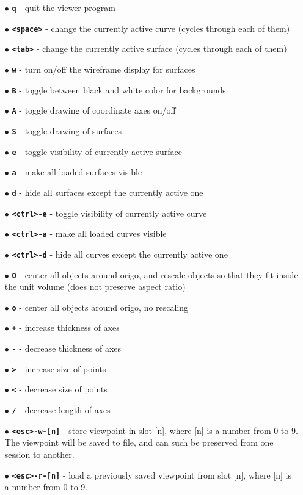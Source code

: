 \begin{itemize}
\item[$\bullet$] \textbf{\verb/q/} - quit the viewer program
\item[$\bullet$] \textbf{\verb/<space>/} - change the currently active curve 
(cycles through each of them)
\item[$\bullet$] \textbf{\verb/<tab>/} - change the currently active surface 
(cycles through each of them)
\item[$\bullet$] \textbf{\verb/w/} - turn on/off the wireframe display for surfaces
\item[$\bullet$] \textbf{\verb/B/} - toggle between black and white color for backgrounds
\item[$\bullet$] \textbf{\verb/A/} - toggle drawing of coordinate axes on/off
\item[$\bullet$] \textbf{\verb/S/} - toggle drawing of surfaces
\item[$\bullet$] \textbf{\verb/e/} - toggle visibility of currently active surface
\item[$\bullet$] \textbf{\verb/a/} - make all loaded surfaces visible
\item[$\bullet$] \textbf{\verb/d/} - hide all surfaces except the currently active one
\item[$\bullet$] \textbf{\verb/<ctrl>-e/} - toggle visibility of currently active curve
\item[$\bullet$] \textbf{\verb/<ctrl>-a/} - make all loaded curves visible
\item[$\bullet$] \textbf{\verb/<ctrl>-d/} - hide all curves except the currently active one
\item[$\bullet$] \textbf{\verb/O/} - center all objects around origo, and rescale objects
so that they fit inside the unit volume (does not preserve aspect ratio)
\item[$\bullet$] \textbf{\verb/o/} - center all objects around origo, no rescaling
\item[$\bullet$] \textbf{\verb/+/} - increase thickness of axes
\item[$\bullet$] \textbf{\verb/-/} - decrease thickness of axes
\item[$\bullet$] \textbf{\verb/>/} - increase size of points
\item[$\bullet$] \textbf{\verb/</} - decrease size of points
\item[$\bullet$] \textbf{\verb-/-} - decrease length of axes
\item[$\bullet$] \textbf{\verb/<esc>-w-[n]/} - store viewpoint in slot [n], where [n]
is a number from 0 to 9.  The viewpoint will be saved to file, and can such be preserved
from one session to another.
\item[$\bullet$] \textbf{\verb/<esc>-r-[n]/} - load a previously saved viewpoint from
slot [n], where [n] is a number from 0 to 9.
\end{itemize}
